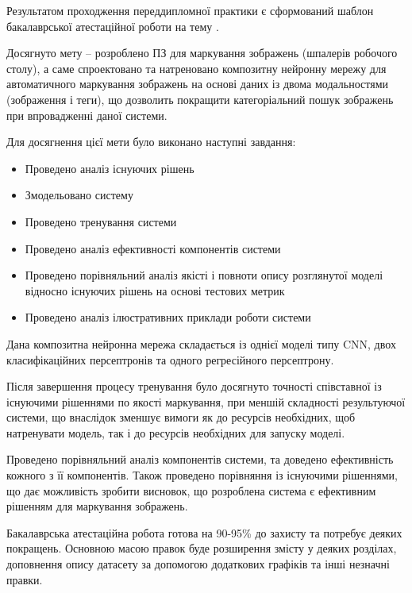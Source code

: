 \documentclass{udstu}
\begin{document}

Результатом проходження переддипломної практики є сформований шаблон бакалаврської атестаційної роботи на тему
.

Досягнуто мету -- розроблено ПЗ для маркування зображень (шпалерів робочого столу), а саме
спроектовано та натреновано композитну нейронну мережу для автоматичного маркування зображень на основі
даних із двома модальностями (зображення і теги), що дозволить покращити категоріальний пошук
зображень при впровадженні даної системи.

Для досягнення цієї мети було виконано наступні завдання:

\begin{itemize}
	\item Проведено аналіз існуючих рішень
	\item Змодельовано систему
	\item Проведено тренування системи
	\item Проведено аналіз ефективності компонентів системи
	\item Проведено порівняльний аналіз якісті і повноти опису розглянутої моделі
	відносно існуючих рішень на основі тестових метрик
	\item Проведено аналіз ілюстративних приклади роботи системи
\end{itemize}

Дана композитна нейронна мережа складається із однієї моделі типу CNN, двох класифікаційних
персептронів та одного регресійного персептрону.

Після завершення процесу тренування було досягнуто точності співставної із існуючими рішеннями
по якості маркування, при меншій складності результуючої системи, що внаслідок зменшує
вимоги як до ресурсів необхідних, щоб натренувати модель, так і до ресурсів необхідних для
запуску моделі.

Проведено порівняльний аналіз компонентів системи, та доведено ефективність кожного з її компонентів.
Також проведено порівняння із існуючими рішеннями, що дає можливість зробити висновок, що розроблена
система є ефективним рішенням для маркування зображень.

Бакалаврська атестаційна робота готова на 90-95\% до захисту та потребує деяких покращень.
Основною масою правок буде розширення змісту у деяких розділах, доповнення опису датасету за
допомогою додаткових графіків та інші незначні правки.
\end{document}
